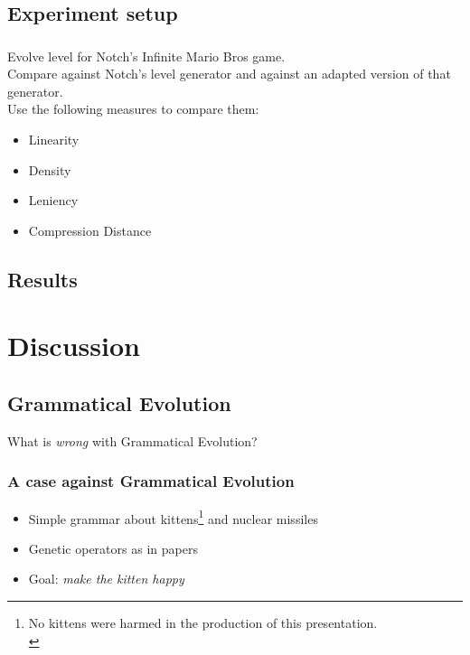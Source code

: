 \documentclass{beamer}
\makeatletter
\newcommand*{\currentname}{\@currentlabelname}
\makeatother
\begin{document}
\subsection{Experiment setup}
\begin{frame}
\frametitle{\currentname}
Evolve level for Notch's Infinite Mario Bros game.\\
Compare against Notch's level generator and against an adapted version of that generator.\\
Use the following measures to compare them:
\begin{itemize}
\item Linearity
\item Density
\item Leniency
\item Compression Distance
\end{itemize}
\end{frame}

\subsection{Results}
\begin{frame}
\frametitle{\currentname}
\end{frame}



\section{Discussion}
\subsection{Grammatical Evolution}
\begin{frame}
\begin{center}
\large What is \textit{wrong} with Grammatical Evolution?
\end{center}
\end{frame}

\begin{frame}
\frametitle{A case against Grammatical Evolution}
\begin{itemize}
\item Simple grammar about kittens\footnote{No kittens were harmed in the production of this presentation.\\} and nuclear missiles
\item Genetic operators as in papers
\item Goal: \textit{make the kitten happy}
\end{itemize}
\end{frame}
\end{document}

